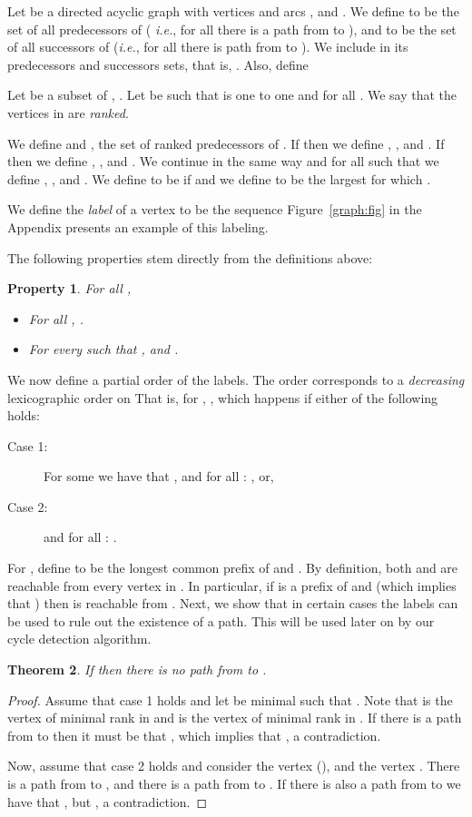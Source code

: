 \documentclass[11pt]{article}
\theoremstyle{plain}
\newtheorem{thm}{Theorem}[section]
\newtheorem{prop}[thm]{Property}
\theoremstyle{definition}
\theoremstyle{remark}
\numberwithin{equation}{section}
\begin{document}
Let  be a directed acyclic graph with vertices  and arcs ,  and  .
We define   to be the set of all predecessors of  ({\sl
i.e.}, for all  there is a path from  to ),  and
 to be the set of all successors of  ({\sl i.e.}, for all
 there is path from  to ). We include  in its
predecessors and successors sets, that is, . Also, define 

Let  be a subset of , .  Let   be such that  is one to
one and  for all . We say that the
vertices in  are {\em ranked}.

We define  and , the set of ranked predecessors of
. If  then we define , 
, and  . If  then we define , , and  .  We continue in the same way and for all  such that  we define , ,  and
. We define  to be  if  and
 we define  to be the largest  for which .




 We define the
\emph{label} of a vertex  to be the sequence  Figure~\ref{graph:fig} in the Appendix presents an example of this labeling.

The following
properties stem directly from the definitions above:
\begin{prop}
For all ,
\begin{itemize}
\item For all , .
\item For every  such that ,
  and .
\end{itemize}
\end{prop}

We now define a partial order  of the labels.  The order
  corresponds to a
{\em decreasing} lexicographic order on 
That is, for , ,
which happens if either of the following holds:
\begin{description}
\item[Case 1:] For some  we have that , and for all : , or,
\item[Case 2:]  and for all :
.
\end{description}

For , define  to  be the longest
common prefix of  and . By definition, both 
and  are reachable from every vertex in . In
particular, if  is a prefix of  and 
(which implies that ) then  is reachable from .
Next, we show that in certain cases the labels can be used to rule out the existence of a path. This will be used later on by our cycle detection algorithm.

\begin{thm}\label{T-no-path}
If  then there is no path from  to .
\end{thm}
\begin{proof}
Assume that case 1 holds and let  be minimal such that
. Note that  is the vertex of
minimal rank in  and  is the vertex of minimal
rank in . If there is a path from  to  then it must be
that , which implies that , a contradiction.

Now, assume that case 2 holds and consider the vertex  (), and the vertex . There is a path from  to ,  and there is a path
from  to . If there is also a path from  to  we have that , but , a contradiction.
\end{proof}
\end{document}
